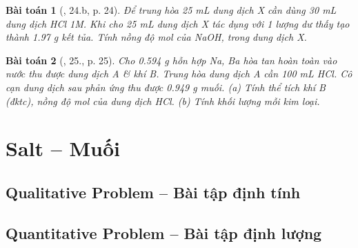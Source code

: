 \documentclass{article}
\newtheorem{baitoan}{Bài toán}
\begin{document}
\begin{baitoan}[\cite{An_350_BT_Hoa_Hoc_9}, 24.b, p. 24]
	Để trung hòa \emph{25 mL} dung dịch X cần dùng \emph{30 mL} dung dịch \emph{HCl 1M}. Khi cho \emph{25 mL} dung dịch X tác dụng với 1 lượng dư \emph{} thấy tạo thành \emph{1.97 g} kết tủa. Tính nồng độ mol của \emph{NaOH, } trong dung dịch X.
\end{baitoan}

\begin{baitoan}[\cite{An_350_BT_Hoa_Hoc_9}, 25., p. 25]
	Cho \emph{0.594 g} hỗn hợp \emph{Na, Ba} hòa tan hoàn toàn vào nước thu được dung dịch A \& khí B. Trung hòa dung dịch A cần \emph{100 mL HCl}. Cô cạn dung dịch sau phản ứng thu được \emph{0.949 g} muối. (a) Tính thể tích khí B (đktc), nồng độ mol của dung dịch \emph{HCl}. (b) Tính khối lượng mỗi kim loại.
\end{baitoan}


\section{Salt -- Muối}

\subsection{Qualitative Problem -- Bài tập định tính}

\subsection{Quantitative Problem -- Bài tập định lượng}


\printbibliography[heading=bibintoc]
	
\end{document}
